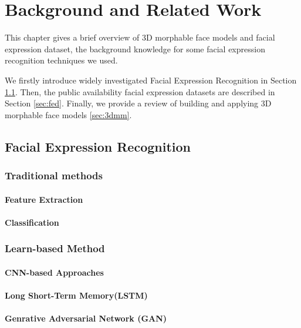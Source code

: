 \chapter{Background and Related Work}
\label{cha:background}

This chapter gives a brief overview of 3D morphable face models and facial expression dataset, the background knowledge for some facial expression recognition techniques we used.

We firstly introduce widely investigated Facial Expression Recognition in Section \ref{sec:fer}. Then, the public availability facial expression datasets are described in Section \ref{sec:fed}. Finally, we provide a
review of building and applying 3D morphable face models \ref{sec:3dmm}.

\section{Facial Expression Recognition}
\label{sec:fer}

\subsection{Traditional methods}
\subsubsection{Feature Extraction}

\subsubsection{Classification}

\subsection{Learn-based Method}

\subsubsection{CNN-based Approaches}
\subsubsection{Long Short-Term Memory(LSTM)}
\subsubsection{Genrative Adversarial Network (GAN)}


